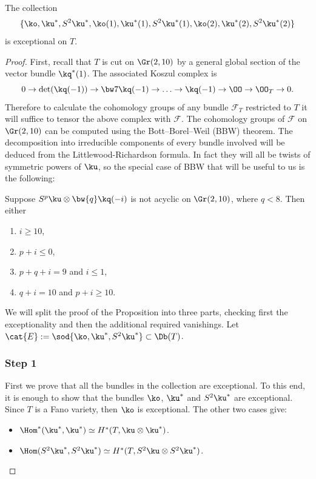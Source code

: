\begin{prop}\label{prop:exc-coll-on-T}
The collection
\[
\{\ko,\ku^*,S^2\ku^*,\ko(1),\ku^*(1),S^2\ku^*(1),\ko(2),\ku^*(2),S^2\ku^*(2)\}
\]
is exceptional on $T$.
\end{prop}

\begin{proof}
First, recall that $T$ is cut on $\Gr(2,10)$ by a general global section of the vector bundle $\kq^*(1)$. The associated Koszul complex is \begin{equation*}\label{eqn:koszul}
0 \to \det(\kq(-1)) \to \bw7\kq(-1) \to \ldots \to \kq(-1) \to \OO \to \OO_T \to 0.
\end{equation*}
Therefore to calculate the cohomology groups of any bundle $\mathcal{F}_T$ restricted to $T$ it will suffice to tensor the above complex with $\mathcal{F}$. The cohomology groups of $\mathcal{F}$ on $\Gr(2,10)$ can be computed using the Bott--Borel--Weil (BBW) theorem. The decomposition into irreducible components of every bundle involved will be deduced from the Littlewood-Richardson formula. In fact they will all be twists of symmetric powers of $\ku$, so the special case of BBW that will be useful to us is the following:

\begin{lemma}\label{BBW}
Suppose $S^p\ku\otimes\bw{q}\kq (-i)$ is not acyclic on $\Gr(2,10)$, where $q<8$.
Then either
\begin{enumerate}
\item $i\ge 10$,
\item $p+i\le 0$,
\item $p+q+i=9$ and $i\le 1$,
\item $q+i=10$ and $p+i\ge 10$.
\end{enumerate}
\end{lemma}

We will split the proof of the Proposition into three parts,
checking first the exceptionality and then the additional required vanishings.
Let $\cat{E}:= \sod{\ko,\ku^*,S^2\ku^*} \subset \Db(T)$.

\subsubsection*{Step 1}
First we prove that all the bundles in the collection are exceptional. To this end, it is enough to show that
the bundles $\ko$, $\ku^*$ and $S^2\ku^*$ are exceptional. Since $T$ is a Fano variety, then
$\ko$ is exceptional. The other two cases give:
\begin{itemize}
\item $\Hom^*(\ku^*,\ku^*) \simeq H^*(T,\ku \otimes \ku^*)$.
\item $\Hom(S^2\ku^*,S^2\ku^*) \simeq H^*(T,S^2\ku \otimes S^2\ku^*)$.
\end{itemize}


\end{proof}

